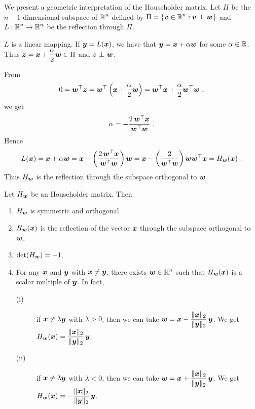 We present a geometric interpretation of the Householder matrix.  Let
$\Pi$ be the $n-1$ dimensional subspace of $\displaystyle \mathbb{R}^n$ defined by 
$\displaystyle \Pi = \{ \bm{v} \in \mathbb{R}^n : \bm{v} \operatorname{\,\bot\,} \bm{w}\}$ and
$\displaystyle L:\mathbb{R}^n \to \mathbb{R}^n$ be the reflection through $\Pi$.


$L$ is a linear mapping.   If $\bm{y} = L(\bm{x})$, we have that
$\bm{y} = \bm{x} + \alpha \bm{w}$ for some $\alpha \in \mathbb{R}$.
Thus $\displaystyle \bm{z} = \bm{x} + \frac{\alpha}{2} \bm{w} \in \Pi$
and $\bm{z} \operatorname{\,\bot\,} \bm{w}$.

From
\[
0 = \VEC{w}^\top \VEC{z}
= \VEC{w}^\top \left( \VEC{x} +  \frac{\alpha}{2} \VEC{w} \right)
= \VEC{w}^\top \VEC{x} +  \frac{\alpha}{2} \VEC{w}^\top \VEC{w} \ ,
\]
we get
\[
  \alpha = - \frac{2\, \bm{w}^\top \bm{x}}
    {\bm{w}^\top\bm{w}} \ .
\]
Hence
\[
L(\bm{x}) = \bm{x} + \alpha \bm{w}
= \bm{x} - \left( \frac{2\, \bm{w}^\top \bm{x}}
{\bm{w}^\top\bm{w}} \right) \bm{w}
= \bm{x} - \left(\frac{2}{\bm{w}^\top\bm{w}}\right)
\bm{w} \bm{w}^\top \bm{x}
= H_{\bm{w}}(\bm{x}) \ .
\]
Thus $H_{\bm{w}}$ is the reflection through the subspace orthogonal
to $\bm{w}$.

\begin{theorem}
Let $H_{\bm{w}}$ be an \nn Householder matrix.  Then
\begin{enumerate}
\item $H_{\bm{w}}$ is symmetric and orthogonal.
\item $H_{\bm{w}}(\bm{x})$ is the reflection of the vector $\bm{x}$
through the subspace orthogonal to $\bm{w}$.
\item $\det(H_{\bm{w}}) = -1$.
\item \label{C14L7}
For any $\bm{x}$ and $\bm{y}$ with $\bm{x} \neq \bm{y}$, there
exists $\displaystyle \bm{w} \in \mathbb{R}^n$ such that
$H_{\bm{w}}(\bm{x})$ is a scalar multiple of $\bm{y}$.  In fact,
\begin{description}
\item[(i)] if $\bm{x} \neq \lambda \bm{y}$ with $\lambda > 0$, then we can
take $\displaystyle \bm{w} = \bm{x} -
\frac{\|\bm{x}\|_2}{\|\bm{y}\|_2}\,\bm{y}$.  We get
$\displaystyle H_{\bm{w}}(\bm{x}) =
\frac{\|\bm{x}\|_2}{\|\bm{y}\|_2} \, \bm{y}$.
\item[(ii)] if $\bm{x} \neq \lambda \bm{y}$ with $\lambda < 0$, then we can
take $\displaystyle
\bm{w} = \bm{x} + \frac{\|\bm{x}\|_2}{\|\bm{y}\|_2}\,\bm{y}$.
We get $\displaystyle H_{\bm{w}}(\bm{x}) =
-\frac{\|\bm{x}\|_2}{\|\bm{y}\|_2}\,\bm{y}$.
\end{description}
\end{enumerate}
\label{C14L8}
\end{theorem}

